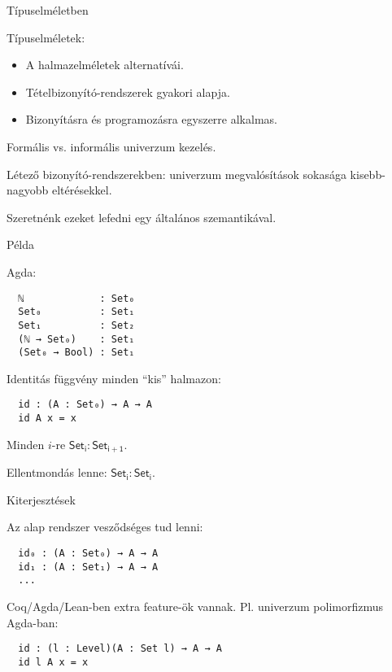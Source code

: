 \documentclass[dvipsnames,10pt,aspectratio=169]{beamer}
\begin{document}
\begin{frame}[fragile]{Típuselméletben}

Típuselméletek:
\begin{itemize}
  \item A halmazelméletek alternatívái.
  \item Tételbizonyító-rendszerek gyakori alapja.
  \item Bizonyításra és programozásra egyszerre alkalmas.
\end{itemize}

Formális vs. informális univerzum kezelés.
\vspace{1em}

Létező bizonyító-rendszerekben: univerzum megvalósítások sokasága kisebb-nagyobb eltérésekkel.
\vspace{1em}

Szeretnénk ezeket lefedni egy általános szemantikával.

\end{frame}

\begin{frame}[fragile]{Példa}

Agda:
\begin{verbatim}
  ℕ             : Set₀
  Set₀          : Set₁
  Set₁          : Set₂
  (ℕ → Set₀)    : Set₁
  (Set₀ → Bool) : Set₁
\end{verbatim}

Identitás függvény minden ``kis'' halmazon:
\begin{verbatim}
  id : (A : Set₀) → A → A
  id A x = x
\end{verbatim}

Minden $i$-re $\mathsf{Set_i} : \mathsf{Set_{i + 1}}$.
\vspace{1em}

Ellentmondás lenne: $\mathsf{Set_i} : \mathsf{Set_{i}}$.
\vspace{1em}

\end{frame}

\begin{frame}[fragile]{Kiterjesztések}

Az alap rendszer vesződséges tud lenni:
\begin{verbatim}
  id₀ : (A : Set₀) → A → A
  id₁ : (A : Set₁) → A → A
  ...
\end{verbatim}


Coq/Agda/Lean-ben extra feature-ök vannak.
Pl. univerzum polimorfizmus Agda-ban:
\begin{verbatim}
  id : (l : Level)(A : Set l) → A → A
  id l A x = x
\end{verbatim}


\end{frame}
\end{document}
